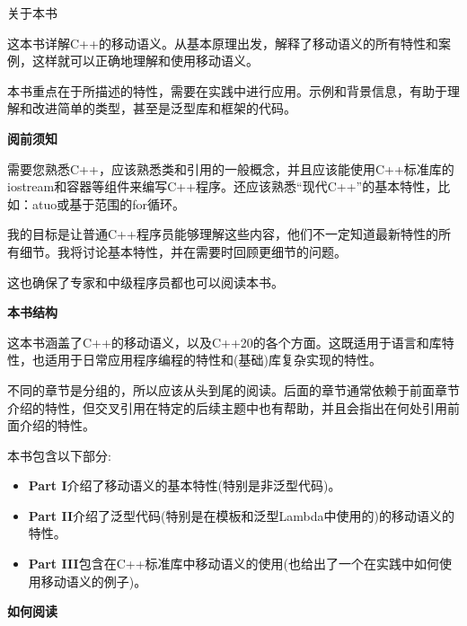 \begin{flushright}
	 关于本书
\end{flushright}

这本书详解C++的移动语义。从基本原理出发，解释了移动语义的所有特性和案例，这样就可以正确地理解和使用移动语义。\par

本书重点在于所描述的特性，需要在实践中进行应用。示例和背景信息，有助于理解和改进简单的类型，甚至是泛型库和框架的代码。\par

\hspace*{\fill} \par %
\textbf{阅前须知}

需要您熟悉C++，应该熟悉类和引用的一般概念，并且应该能使用C++标准库的iostream和容器等组件来编写C++程序。还应该熟悉“现代C++”的基本特性，比如：atuo或基于范围的for循环。\par

我的目标是让普通C++程序员能够理解这些内容，他们不一定知道最新特性的所有细节。我将讨论基本特性，并在需要时回顾更细节的问题。\par

这也确保了专家和中级程序员都也可以阅读本书。\par


\hspace*{\fill} \par %
\textbf{本书结构}

这本书涵盖了C++的移动语义，以及C++20的各个方面。这既适用于语言和库特性，也适用于日常应用程序编程的特性和(基础)库复杂实现的特性。\par

不同的章节是分组的，所以应该从头到尾的阅读。后面的章节通常依赖于前面章节介绍的特性，但交叉引用在特定的后续主题中也有帮助，并且会指出在何处引用前面介绍的特性。\par

本书包含以下部分:\par
\begin{itemize}
	\item \textbf{Part I}介绍了移动语义的基本特性(特别是非泛型代码)。
	\item \textbf{Part II}介绍了泛型代码(特别是在模板和泛型Lambda中使用的)的移动语义的特性。
	\item \textbf{Part III}包含在C++标准库中移动语义的使用(也给出了一个在实践中如何使用移动语义的例子)。
\end{itemize}


\hspace*{\fill} \par %
\textbf{如何阅读}

